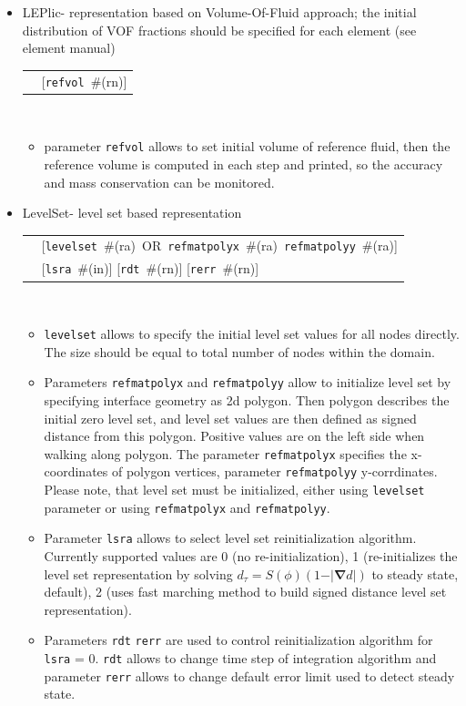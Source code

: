 \documentclass[a4paper]{article}
\makeatletter
\newcommand{\grad}{\vect{\nabla}}
\newcommand{\vect}[1]{\boldsymbol{#1}} %
\newcommand{\param}[1]{\texttt{#1}} %
\newcommand{\optional}[1]{[#1]} %
\newcommand{\field}[2]{\param{#1}~\#{\tiny(#2)}} %
\newcommand{\optField}[2]{\optional{\field{#1}{#2}}}
\newenvironment{record}[1][]{\begin{tabular}{|ll}}{\end{tabular}\\}
\newcommand{\recentry}[2]{{#1}&{#2}\\}
\newcounter{rcc}
\newenvironment{record}[1][\textwidth]{\setcounter{rcc}{0}\begin{tabular*}{#1}{|ll@{\extracolsep{\fill}}r}}{\end{tabular*}\\}
\newcommand{\recentry}[2]{\ifthenelse{\value{rcc}>0}{&$\backslash$ \\}{\setcounter{rcc}{1}}{#1}&{#2}}
\makeatother
\begin{document}
\begin{itemize}
\item LEPlic- representation based on Volume-Of-Fluid approach; the initial distribution of VOF fractions should be specified for each element (see element manual)\\
  \begin{record}[0.9\textwidth]
    \recentry{}{\optField{refvol}{rn}}
  \end{record}
\begin{itemize}
\item
parameter \param{refvol} allows to set initial volume of reference fluid, then the reference volume is computed in each step and printed, so the accuracy and mass conservation can be monitored.
\end{itemize}
\item[]
LevelSet- level set based representation\\
\begin{record}[0.9\textwidth]
  \recentry{}{\mbox{[\field{levelset}{ra} OR \field{refmatpolyx}{ra} \field{refmatpolyy}{ra}]}}
  \recentry{}{\optField{lsra}{in} \optField{rdt}{rn} \optField{rerr}{rn}}
\end{record}
\begin{itemize}
\item \param{levelset} allows to specify the initial level set values for all nodes directly. The size should be equal to total number of nodes within the domain.
\item Parameters \param{refmatpolyx} and \param{refmatpolyy} allow to initialize level set by specifying interface geometry as 2d polygon. Then polygon describes the initial zero level set, and level set values are then defined as signed distance from this polygon. Positive values are on the left side when walking along polygon. The parameter \param{refmatpolyx} specifies the x-coordinates of polygon vertices, parameter \param{refmatpolyy} y-corrdinates. Please note, that level set must be initialized, either using \param{levelset} parameter or using \param{refmatpolyx} and \param{refmatpolyy}.
\item Parameter \param{lsra} allows to select level set reinitialization algorithm. Currently supported values are 0 (no re-initialization), 1 (re-initializes the level set representation by solving $d_{\tau} = S(\phi)(1-\vert\grad d\vert)$ to steady state, default), 2 (uses fast  marching method to build signed distance level set representation).
\item Parameters \param{rdt} \param{rerr} are used to control reinitialization algorithm for \param{lsra} = 0. \param{rdt} allows to change time step of integration algorithm and parameter \param{rerr} allows to change default error limit used to detect steady state.
\end{itemize}
\end{itemize}
\end{document}
